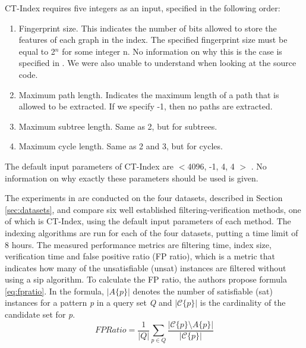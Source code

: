 \documentclass{l4proj}
\newcommand{\fancyC}{\mathcal{C}}
\begin{document}
CT-Index requires five integers as an input, specified in the following order:
\begin{enumerate}
\item Fingerprint size. This indicates the number of bits allowed to store the features of each graph in the index. The specified fingerprint size must be equal to 2$^{n}$ for some integer n. No information on why this is the case is specified in \cite{ctindex}. We were also unable to understand when looking at the source code.
\item Maximum path length. Indicates the maximum length of a path that is allowed to be extracted. If we specify -1, then no paths are extracted.
\item Maximum subtree length. Same as 2, but for subtrees.
\item Maximum cycle length. Same as 2 and 3, but for cycles.
\end{enumerate}

The default input parameters of CT-Index are $<$4096, -1, 4, 4 $>$ \cite{ctindex, foteini}. No information on why exactly these parameters should be used is given.

The experiments in \cite{foteini} are conducted on the four datasets, described in Section \ref{sec:datasets}, and compare six well established filtering-verification methods, one of which is CT-Index, using the default input parameters of each method. The indexing algorithms are run for each of the four datasets, putting a time limit of 8 hours. The measured performance metrics are filtering time, index size, verification time and false positive ratio (FP ratio), which is a metric that indicates how many of the unsatisfiable (\gls{unsat}) instances are filtered without using a \gls{sip} algorithm. To calculate the FP ratio, the authors propose formula \ref{eq:fpratio}. In the formula, \emph{$|A\{p\}|$} denotes the number of satisfiable (\gls{sat}) instances for a pattern \emph{p} in a query set \emph{Q} and \emph{$|\fancyC\{p\}|$} is the cardinality of the candidate set for \emph{p}.
\begin{equation}
\label{eq:fpratio}
FP Ratio = \frac{1}{|Q|} \sum_{p \in Q} \frac{|\fancyC\{p\} \setminus A\{p\}|}{|\fancyC\{p\}|}
\end{equation}
\end{document}
